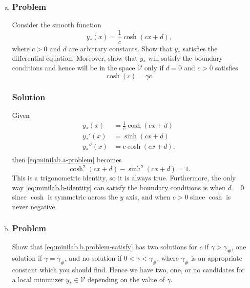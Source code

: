 \documentclass[12pt,twoside]{article}
\begin{document}
\begin{enumerate}[(a)]
\item
\subsubsection*{Problem}
Consider the smooth function
\begin{equation}
  \label{eq:minilab.b-problem-smooth}
  y_*(x)=\frac{1}{c}\cosh(cx+d),
\end{equation}
where $c>0$ and $d$ are arbitrary constants. Show that $y_*$ satisfies the
differential equation. Moreover, show that $y_*$ will satisfy the boundary
conditions and hence will be in the space $\mathcal{V}$ only if $d=0$ and $c>0$
satisfies
\begin{equation}
  \label{eq:minilab.b.problem-satisfy}
  \cosh(c) = \gamma c.
\end{equation}

\subsubsection*{Solution}
Given
\begin{align*}
  y_*(x) &= \frac{1}{c}\cosh(cx+d) \\
  y_*'(x) &= \sinh(cx+d) \\
  y_*''(x) &= c\cosh(cx+d), \\
\end{align*}
then \cref{eq:minilab.a-problem} becomes
\begin{equation}
  \label{eq:minilab.b-identity}
  \cosh^2(cx+d) - \sinh^2(cx+d) = 1.
\end{equation}
This is a trigonometric identity, so it is always true. Furthermore, the only
way \cref{eq:minilab.b-identity} can satisfy the boundary conditions is when
$d=0$ since $\cosh$ is symmetric across the $y$ axis, and when $c>0$ since
$\cosh$ is never negative.

\item
\subsubsection*{Problem}
Show that \cref{eq:minilab.b.problem-satisfy} has two solutions for $c$ if
$\gamma > \gamma_{\#}$, one solution if $\gamma = \gamma_{\#}$, and no solution
if $0<\gamma<\gamma_{\#}$, where $\gamma_{\#}$ is an appropriate constant which
you should find. Hence we have two, one, or no candidates for a local minimizer
$y_*\in\mathcal{V}$ depending on the value of $\gamma$.


\end{enumerate}
\end{document}
